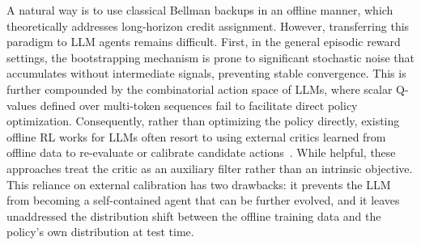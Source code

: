 \documentclass{article}
\theoremstyle{plain}
\theoremstyle{definition}
\theoremstyle{remark}
\begin{document}
A natural way is to use classical Bellman backups in an offline manner, which theoretically addresses long-horizon credit assignment. However, transferring this paradigm to LLM agents remains difficult. First, in the general episodic reward settings, the bootstrapping mechanism is prone to significant stochastic noise that accumulates without intermediate signals, preventing stable convergence. This is further compounded by the combinatorial action space of LLMs, where scalar Q-values defined over multi-token sequences fail to facilitate direct policy optimization.
Consequently, rather than optimizing the policy directly, existing offline RL works for LLMs often resort to using external critics learned from offline data to re-evaluate or calibrate candidate actions~\citep{snell2023offline, retrospex}. While helpful, these approaches treat the critic as an auxiliary filter rather than an intrinsic objective. This reliance on external calibration has two drawbacks: it prevents the LLM from becoming a self-contained agent that can be further evolved, and it leaves unaddressed the distribution shift between the offline training data and the policy's own distribution at test time.





\end{document}
